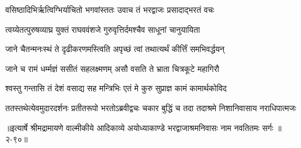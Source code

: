 \twolineshloka
{वसिष्ठादिभिर्ऋत्विग्भिर्याचितो भगवांस्ततः}
{उवाच तं भरद्वाजः प्रसादाद्भरतं वचः} %

\twolineshloka
{त्वय्येतत्पुरुषव्याघ्र युक्तं राघववंशजे}
{गुरुवृत्तिर्दमश्चैव साधूनां चानुयायिता} %

\twolineshloka
{जाने चैतन्मनःस्थं ते दृढीकरणमस्त्विति}
{अपृच्छं त्वां तथात्यर्थं कीर्त्तिं समभिवर्द्धयन्} %

\twolineshloka
{जाने च रामं धर्म्मज्ञं ससीतं सहलक्ष्मणम्}
{असौ वसति ते भ्राता चित्रकूटे महागिरौ} %

\twolineshloka
{श्वस्तु गन्तासि तं देशं वसाद्य सह मन्त्रिभिः}
{एतं मे कुरु सुप्राज्ञ कामं कामार्थकोविद} %

\twolineshloka
{ततस्तथेत्येवमुदारदर्शनः प्रतीतरूपो भरतोऽब्रवीद्वचः}
{चकार बुद्धिं च तदा तदाश्रमे निशानिवासाय नराधिपात्मजः} %


॥इत्यार्षे श्रीमद्रामायणे वाल्मीकीये आदिकाव्ये अयोध्याकाण्डे भरद्वाजाश्रमनिवासः नाम नवतितमः सर्गः ॥२-९०॥
